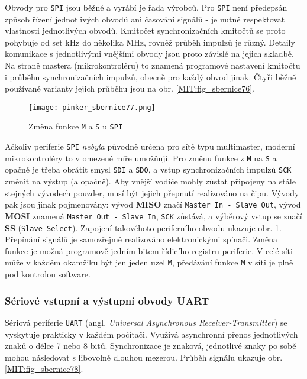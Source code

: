         Obvody pro \texttt{SPI} jsou běžné a vyrábí je řada výrobců. Pro \texttt{SPI} není 
        předepsán způsob řízení jednotlivých obvodů ani časování signálů - je nutné respektovat 
        vlastnosti jednotlivých obvodů. Kmitočet synchronizačních kmitočtů se proto pohybuje od set 
        kHz do několika MHz, rovněž průběh impulzů je různý. Detaily komunikace s jednotlivými 
        vnějšími obvody jsou proto závislé na jejich skladbě. Na straně mastera (mikrokontroléru) 
        to znamená programové nastavení kmitočtu i průběhu synchronizačních impulzů, obecně pro 
        každý obvod jinak. Čtyři běžně používané varianty jejich průběhu jsou na obr. 
        \ref{MIT:fig_sbernice76}.
        
        \begin{figure}[ht!] %
          \centering
          \texttt{[image: pinker\_sbernice77.png]}
          \caption{Změna funkce \texttt{M} a \texttt{S} u \texttt{SPI}}
          \label{MIT:fig_sbernice77}
        \end{figure}

        Ačkoliv periferie \texttt{SPI} \emph{nebyla} původně určena pro sítě typu multimaster, 
        moderní mikrokontroléry to v omezené míře umožňují. Pro změnu funkce z \texttt{M} na 
        \texttt{S} a opačně je třeba obrátit smysl \texttt{SDI} a \texttt{SDO}, a vstup 
        synchronizačních impulzů \texttt{SCK} změnit na výstup (a opačně). Aby vnější vodiče mohly 
        zůstat připojeny na stále stejných vývodech pouzder, musí být jejich přepnutí realizováno 
        na čipu. Vývody pak jsou jinak pojmenovány: vývod \textbf{MISO} značí \texttt{Master In - 
        Slave Out}, vývod \textbf{MOSI} znamená \texttt{Master Out - Slave In}, \texttt{SCK} 
        zůstává, a výběrový vstup se značí \textbf{SS} (\texttt{Slave Select}). Zapojení 
        takovéhoto periferního obvodu ukazuje obr. \ref{MIT:fig_sbernice77}. Přepínání signálů je 
        samozřejmě realizováno elektronickými spínači. Změna funkce je možná programově jedním 
        bitem řídicího registru periferie. V celé síti může v každém okamžiku být jen jeden uzel 
        \texttt{M}, předávání funkce \texttt{M} v síti je plně pod kontrolou software.
        
      \subsubsection{Sériové vstupní a výstupní obvody UART}
        Sériová periferie \texttt{UART} (angl. \emph{Universal Asynchronous Receiver-Transmitter}) 
        se vyskytuje prakticky v každém počítači. Využívá asynchronní přenos jednotlivých znaků o 
        délce 7 nebo 8 bitů. Synchronizace je znaková, jednotlivé znaky po sobě mohou následovat s 
        libovolně dlouhou mezerou. Průběh signálu ukazuje obr. \ref{MIT:fig_sbernice78}.
        

